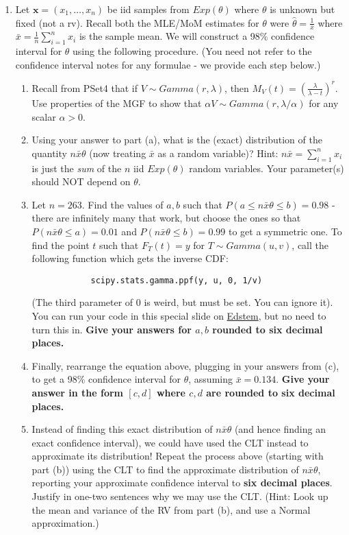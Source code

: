 \documentclass[12pt]{article}
\renewcommand{\|}{\mid}
\begin{document}
\begin{enumerate}
    \item Let $\mathbf{x}=(x_1,\dots,x_n)$ be iid samples from $Exp(\theta)$ where $\theta$ is unknown but fixed (not a rv). Recall both the MLE/MoM estimates for $\theta$ were $\hat{\theta}=\frac{1}{\bar{x}}$ where $\bar{x}=\frac{1}{n}\sum_{i=1}^n x_i$ is the sample mean.  We will construct a 98\% confidence interval for $\theta$ using the following procedure. (You need not refer to the confidence interval notes for any formulae - we provide each step below.)
    \begin{enumerate}
        \item Recall from PSet4 that if $V\sim Gamma(r,\lambda)$, then $M_V(t)=\left(\frac{\lambda}{\lambda-t}\right)^r$. Use properties of the MGF to show that $\alpha V\sim Gamma(r, \lambda/\alpha)$ for any scalar $\alpha>0$.
        \item Using your answer to part (a), what is the (exact) distribution of the quantity $n\bar{x}\theta$ (now treating $\bar{x}$ as a random variable)? Hint: $n\bar{x}=\sum_{i=1}^n x_i$ is just the \textit{sum} of the $n$ iid $Exp(\theta)$ random variables. Your parameter(s) should NOT depend on $\theta$.
        \item Let $n=263$. Find the values of $a,b$ such that $P\left(a\le n\bar{x}\theta\le b\right)=0.98$ - there are infinitely many that work, but choose the ones so that $P\left(n\bar{x}\theta\le a\right)=0.01$ and $P\left(n\bar{x}\theta\le b\right)=0.99$ to get a symmetric one. To find the point $t$ such that $F_T(t)=y$ for $T\sim Gamma(u,v)$, call the following function which gets the inverse CDF:
        \begin{verbatim}
            scipy.stats.gamma.ppf(y, u, 0, 1/v)
        \end{verbatim}
        (The third parameter of 0 is weird, but must be set. You can ignore it). You can run your code in this special slide on  \textcolor{blue}{\href{https://us.edstem.org/courses/647/lessons/3829/slides/17231}{Edstem}}, but no need to turn this in. \textbf{Give your answers for $a,b$ rounded to six decimal places.}
        \item Finally, rearrange the equation above, plugging in your answers from (c),  to get a 98\% confidence interval for $\theta$, assuming $\bar{x}=0.134$. \textbf{Give your answer in the form $[c,d]$ where $c,d$ are rounded to six decimal places.} 
        \item Instead of finding this exact distribution of $n\bar{x}{\theta}$ (and hence finding an exact confidence interval), we could have used the CLT instead to approximate its distribution! Repeat the process above (starting with part (b)) using the CLT to find the approximate distribution of $n\bar{x}{\theta}$, reporting your approximate confidence interval to \textbf{six decimal places}. Justify in one-two sentences why we may use the CLT. (Hint: Look up the mean and variance of the RV from part (b), and use a Normal approximation.)

\end{enumerate}
\end{enumerate}
\end{document}
